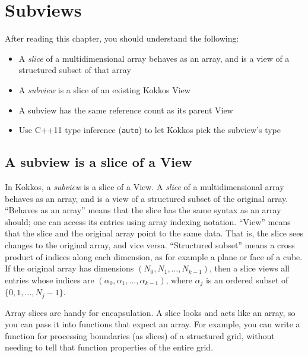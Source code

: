 \section{Subviews}\label{C:Subviews}

After reading this chapter, you should understand the following:
\begin{itemize}
\item A \emph{slice} of a multidimensional array behaves as an array,
  and is a view of a structured subset of that array
\item A \emph{subview} is a slice of an existing Kokkos View
\item A subview has the same reference count as its parent View
\item Use C++11 type inference (\lstinline!auto!) to let Kokkos pick the subview's type
\end{itemize}

\subsection{A subview is a slice of a View}\label{S:Subviews:Slice}

In Kokkos, a \emph{subview} is a slice of a View.  A \emph{slice} of a
multidimensional array behaves as an array, and is a view of a
structured subset of the original array.  ``Behaves as an array''
means that the slice has the same syntax as an array should; one can
access its entries using array indexing notation.  ``View'' means that
the slice and the original array point to the same data.  That is, the
slice sees changes to the original array, and vice versa.
``Structured subset'' means a cross product of indices along each
dimension, as for example a plane or face of a cube.  If the original
array has dimensions $(N_0, N_1, \dots, N_{k-1})$, then a slice views
all entries whose indices are $(\alpha_0, \alpha_1, \dots,
\alpha_{k-1})$, where $\alpha_j$ is an ordered subset of $\{0, 1,
\dots, N_j-1\}$.

Array slices are handy for encapsulation.  A slice looks and acts like
an array, so you can pass it into functions that expect an array.  For
example, you can write a function for processing boundaries (as
slices) of a structured grid, without needing to tell that function
properties of the entire grid.

